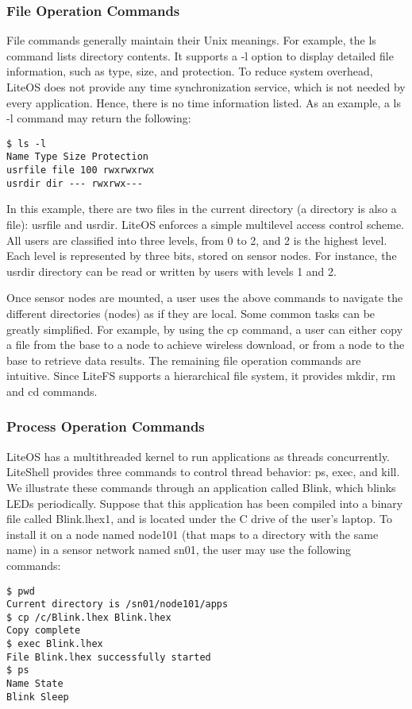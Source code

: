 \subsubsection{File Operation Commands}
File commands generally maintain their Unix meanings.
For example, the ls command lists directory contents. It
supports a -l option to display detailed file information, such
as type, size, and protection. To reduce system overhead,
LiteOS does not provide any time synchronization service,
which is not needed by every application. Hence, there is
no time information listed. As an example, a ls -l command
may return the following:
\begin{lstlisting}[language={[ANSI]C},keywordstyle=\color{blue!70},commentstyle=\color{red!50!green!50!blue!50},frame=shadowbox, rulesepcolor=\color{red!20!green!20!blue!20}]
$ ls -l
Name Type Size Protection
usrfile file 100 rwxrwxrwx
usrdir dir --- rwxrwx---
\end{lstlisting}

In this example, there are two files in the current directory (a directory is also a file): usrfile and usrdir. LiteOS
enforces a simple multilevel access control scheme. All
users are classified into three levels, from 0 to 2, and 2 is
the highest level. Each level is represented by three bits,
stored on sensor nodes. For instance, the usrdir directory
can be read or written by users with levels 1 and 2.

Once sensor nodes are mounted, a user uses the above
commands to navigate the different directories (nodes) as if
they are local. Some common tasks can be greatly simplified. For example, by using the cp command, a user can
either copy a file from the base to a node to achieve wireless download, or from a node to the base to retrieve data
results. The remaining file operation commands are intuitive. Since LiteFS supports a hierarchical file system, it
provides mkdir, rm and cd commands.

\subsubsection{Process Operation Commands}
LiteOS has a multithreaded kernel to run applications as
threads concurrently. LiteShell provides three commands
to control thread behavior: ps, exec, and kill. We illustrate
these commands through an application called Blink, which
blinks LEDs periodically. Suppose that this application has
been compiled into a binary file called Blink.lhex1, and is
located under the C drive of the user’s laptop. To install it
on a node named node101 (that maps to a directory with the
same name) in a sensor network named sn01, the user may
use the following commands:
\begin{lstlisting}[language={[ANSI]C},keywordstyle=\color{blue!70},commentstyle=\color{red!50!green!50!blue!50},frame=shadowbox, rulesepcolor=\color{red!20!green!20!blue!20}]
$ pwd
Current directory is /sn01/node101/apps
$ cp /c/Blink.lhex Blink.lhex
Copy complete
$ exec Blink.lhex
File Blink.lhex successfully started
$ ps
Name State
Blink Sleep
\end{lstlisting}

